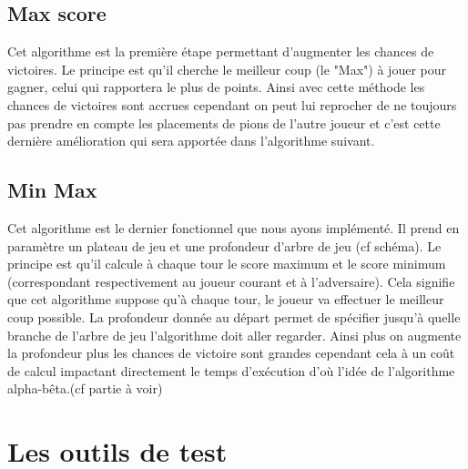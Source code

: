 \documentclass{report}
\begin{document}
		\section{Max score}
		Cet algorithme est la première étape permettant d'augmenter les chances de victoires. Le principe est qu'il cherche le meilleur coup (le "Max") à jouer pour gagner, celui qui rapportera le plus de points. Ainsi avec cette méthode les chances de victoires sont accrues cependant on peut lui reprocher de ne toujours pas prendre en compte les placements de pions de l'autre joueur et c'est cette dernière amélioration qui sera apportée dans l'algorithme suivant. 
		\section{Min Max}
        Cet algorithme est le dernier fonctionnel que nous ayons implémenté. Il prend en paramètre un plateau de jeu et une profondeur d'arbre de jeu (cf schéma). Le principe est qu'il calcule à chaque tour le score maximum et le score minimum (correspondant respectivement au joueur courant et à l'adversaire). Cela signifie que cet algorithme suppose qu'à chaque tour, le joueur va effectuer le meilleur coup possible. La profondeur donnée au départ permet de spécifier jusqu'à quelle branche de l'arbre de jeu l'algorithme doit aller regarder. Ainsi plus on augmente la profondeur plus les chances de victoire sont grandes cependant cela à un coût de calcul impactant directement le temps d'exécution d'où l'idée de l'algorithme alpha-bêta.(cf partie à voir)
	\chapter{Les outils de test}
\end{document}
